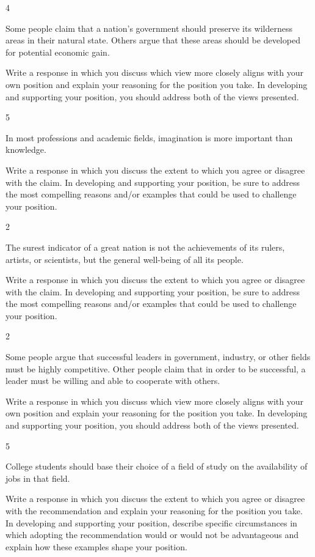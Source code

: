 \documentclass[]{article}
\begin{document}
4

Some people claim that a nation's government should preserve its
wilderness areas in their natural state. Others argue that these areas
should be developed for potential economic gain.

Write a response in which you discuss which view more closely aligns
with your own position and explain your reasoning for the position you
take. In developing and supporting your position, you should address
both of the views presented.

5

In most professions and academic fields, imagination is more important
than knowledge.

Write a response in which you discuss the extent to which you agree or
disagree with the claim. In developing and supporting your position, be
sure to address the most compelling reasons and/or examples that could
be used to challenge your position.

2

The surest indicator of a great nation is not the achievements of its
rulers, artists, or scientists, but the general well-being of all its
people.

Write a response in which you discuss the extent to which you agree or
disagree with the claim. In developing and supporting your position, be
sure to address the most compelling reasons and/or examples that could
be used to challenge your position.

2

Some people argue that successful leaders in government, industry, or
other fields must be highly competitive. Other people claim that in
order to be successful, a leader must be willing and able to cooperate
with others.

Write a response in which you discuss which view more closely aligns
with your own position and explain your reasoning for the position you
take. In developing and supporting your position, you should address
both of the views presented.

5

College students should base their choice of a field of study on the
availability of jobs in that field.

Write a response in which you discuss the extent to which you agree or
disagree with the recommendation and explain your reasoning for the
position you take. In developing and supporting your position, describe
specific circumstances in which adopting the recommendation would or
would not be advantageous and explain how these examples shape your
position.
\end{document}

